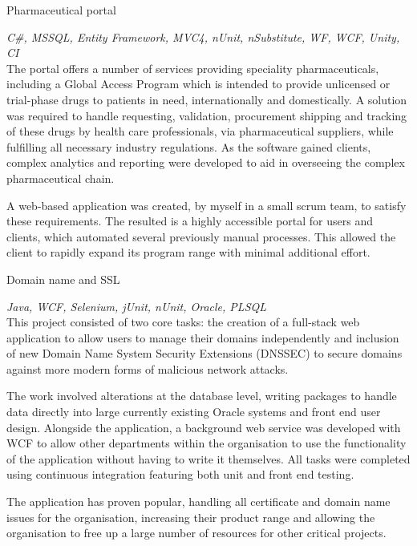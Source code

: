 \documentclass[]{friggeri-cv} %
\begin{document}
\begin{entrylist}
\projectentry
{Pharmaceutical portal}
{\emph{C\#, MSSQL, Entity Framework, MVC4, nUnit, nSubstitute, WF, WCF, Unity, CI} \\
The portal offers a number of services providing speciality pharmaceuticals, including a Global Access Program which is intended to provide unlicensed or trial-phase drugs to patients in need, internationally and domestically. A solution was required to handle requesting, validation, procurement shipping and tracking of these drugs by health care professionals, via pharmaceutical suppliers, while fulfilling all necessary industry regulations. As the software gained clients, complex analytics and reporting were developed to aid in overseeing the complex pharmaceutical chain.

A web-based application was created, by myself in a small scrum team, to satisfy these requirements. The resulted is a highly accessible portal for users and clients, which automated several previously manual processes. This allowed the client to rapidly expand its program range with minimal additional effort.}
\end{entrylist}

\begin{entrylist}
\projectentry
{Domain name and SSL}
{\emph{Java, WCF, Selenium, jUnit, nUnit, Oracle, PLSQL } \\
This project consisted of two core tasks: the creation of a full-stack web application to allow users to manage their domains independently and inclusion of new Domain Name System Security Extensions (DNSSEC) to secure domains against more modern forms of malicious network attacks.

The work involved alterations at the database level, writing packages to handle data directly into large currently existing Oracle systems  and front end user design. Alongside the application, a background web service was developed with WCF to allow other departments within the organisation to use the functionality of the application without having to write it themselves. All tasks were completed using continuous integration featuring both unit and front end testing.

The application has proven popular, handling all certificate and domain name issues for the organisation, increasing their product range and allowing the organisation to free up a large number of resources for other critical projects.}
\end{entrylist}
\end{document}
